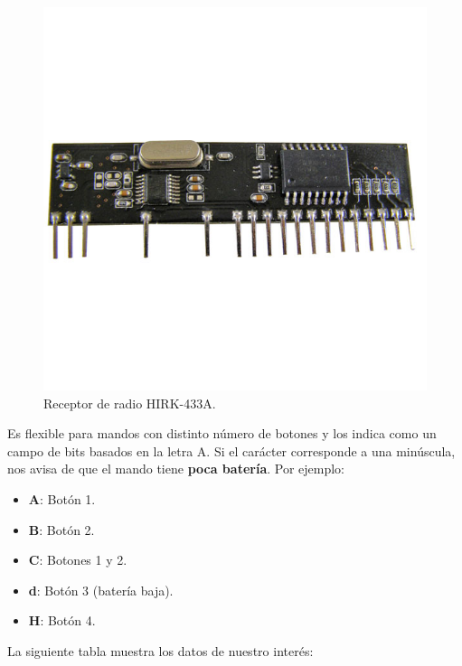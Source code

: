 \begin{figure}[H]
	\noindent \begin{centering}
		\includegraphics[clip=true,trim=0 200 0 200, width=\linewidth/2]{capitulo3/HIRK-433A}
		\par\end{centering}
	\smallskip
	\caption[Receptor de radio HIRK-433A.]{\label{fig:HIRK-433A} Receptor de radio HIRK-433A. \cite{imagen_decoder}}
\end{figure} 

\smallskip

Es flexible para mandos con distinto número de botones y los indica como un campo de bits basados en la letra A. Si el carácter corresponde a una minúscula, nos avisa de que el mando tiene \textbf{poca batería}. Por ejemplo:

\begin{itemize}
	\item \textbf{A}: Botón 1.
	\item \textbf{B}: Botón 2.
	\item \textbf{C}: Botones 1 y 2.
	\item \textbf{d}: Botón 3 (batería baja).
	\item \textbf{H}: Botón 4.
\end{itemize}

La siguiente tabla muestra los datos de nuestro interés:

